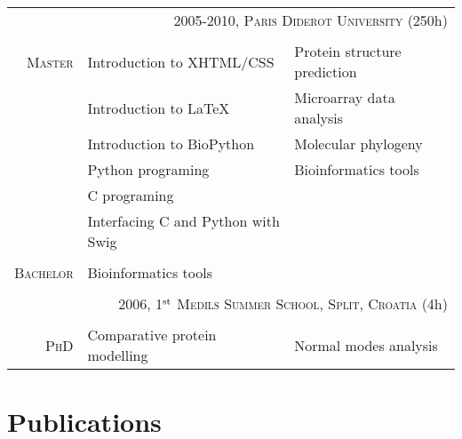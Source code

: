\documentclass[a4paper,10pt]{article}
\begin{document}
\begin{tabular}{r|p{5.5cm}p{5.5cm}}

  \multicolumn{3}{r}{\large \textsc{2005-2010, Paris Diderot University} (250h)} \\
  \multicolumn{3}{l}{}\\
  \textsc{Master} & Introduction to XHTML/CSS & Protein structure prediction\\
  & Introduction to \LaTeX     & Microarray data analysis\\
  & Introduction to BioPython  & Molecular phylogeny\\
  & Python programing & Bioinformatics tools\\  
  & C programing & \\
  & Interfacing C and Python with Swig & \\
  \multicolumn{3}{l}{}\\
  
  \textsc{Bachelor} & Bioinformatics tools & \\
  \multicolumn{3}{l}{}\\

  \multicolumn{3}{r}{\large \textsc{2006, 1$^{\rm st}$ Medils Summer School, Split, Croatia} (4h)} \\
  \multicolumn{3}{l}{}\\
  \textsc{PhD} & Comparative protein modelling & Normal modes analysis\\

\end{tabular}

\section{Publications}
\nocite{*}
\printbibliography[type=article,type=phdthesis,heading=subbibliography,title={Peer reviewed articles}]
\printbibliography[type=inproceedings,heading=subbibliography,title={Proceedings}]
\printbibliography[keyword=oral,heading=subbibliography,title={Oral communications}]
\printbibliography[keyword=poster,heading=subbibliography,title={Posters}]



\end{document}
